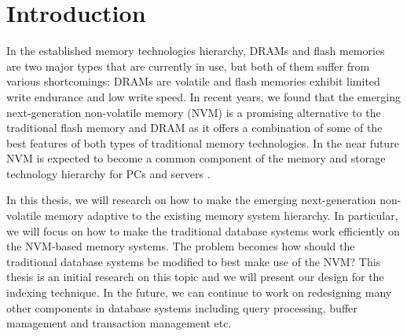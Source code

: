 \chapter{Introduction}
\setcounter{page}{1}
\label{sec:intro}
In the established memory technologies hierarchy, DRAMs and flash memories are two major types 
that are currently in use, but both of them suffer from various shortcomings:
DRAMs are volatile and flash memories exhibit limited write endurance
and low write speed. In recent years, we found that 
the emerging next-generation non-volatile memory (NVM)
is a promising alternative to the traditional flash memory and DRAM
as it offers a combination of some of the best features of both types of traditional memory technologies. 
In the near future NVM is expected to become a common component of the memory and storage
technology hierarchy for PCs and servers \cite{Condit:2009:BIT:1629575.1629589,lee2009architecting,qureshi2009scalable}. 

In this thesis, we 
will research on how to make the emerging next-generation non-volatile memory adaptive to the existing 
memory system hierarchy. In particular, we will focus on how to make the traditional database systems work
efficiently on the NVM-based memory systems. The problem becomes how should the traditional database systems
be modified to best make use of the NVM? This thesis is an initial research on this topic and we will present 
our design for the indexing technique. In the future, we can continue to work on redesigning many other components 
in database systems including query processing, buffer management and transaction management etc. 


